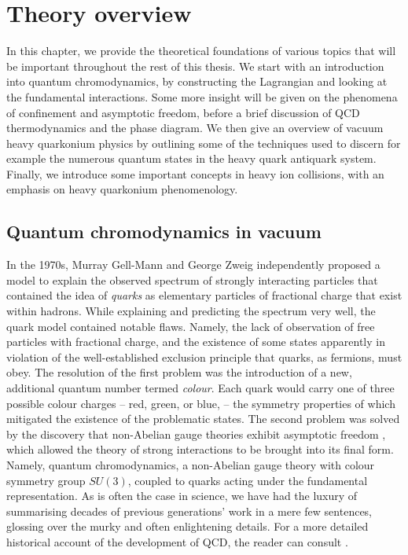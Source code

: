 \documentclass[11pt, a4paper, twoside]{book}
\newcommand{\brac}[1] {\!\left(#1\right)}
\begin{document}
\chapter{Theory overview}
\label{sec:theory_ov}
\onehalfspacing
In this chapter, we provide the theoretical foundations of various topics that will be important throughout the rest of this thesis. We start with an introduction into quantum chromodynamics, by constructing the Lagrangian and looking at the fundamental interactions. Some more insight will be given on the phenomena of confinement and asymptotic freedom, before a brief discussion of QCD thermodynamics and the phase diagram. We then give an overview of vacuum heavy quarkonium physics by outlining some of the techniques used to discern for example the numerous quantum states in the heavy quark antiquark system. Finally, we introduce some important concepts in heavy ion collisions, with an emphasis on heavy quarkonium phenomenology. 
\section{Quantum chromodynamics in vacuum}
In the 1970s, Murray Gell-Mann and George Zweig independently proposed a model to explain the observed spectrum of strongly interacting particles that contained the idea of \emph{quarks} as elementary particles of fractional charge that exist within hadrons. While explaining and predicting the spectrum very well, the quark model contained notable flaws. Namely, the lack of observation of free particles with fractional charge, and the existence of some states apparently in violation of the well-established exclusion principle that quarks, as fermions, must obey. The resolution of the first problem was the introduction of a new, additional quantum number termed \emph{colour}. Each quark would carry one of three possible colour charges -- red, green, or blue, -- the symmetry properties of which mitigated the existence of the problematic states. The second problem was solved by the discovery that non-Abelian gauge theories exhibit asymptotic freedom \cite{Gross:1973id}, which allowed the theory of strong interactions to be brought into its final form. Namely, quantum chromodynamics, a non-Abelian gauge theory with colour symmetry group \(SU\brac{3}\), coupled to quarks acting under the fundamental representation. As is often the case in science, we have had the luxury of summarising decades of previous generations' work in a mere few sentences, glossing over the murky and often enlightening details. For a more detailed historical account of the development of QCD, the reader can consult \cite{Gross:1998jx}.
\end{document}
